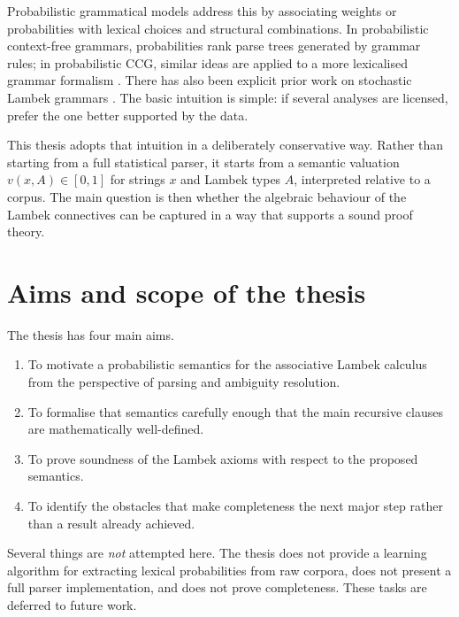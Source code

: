Probabilistic grammatical models address this by associating weights or probabilities with lexical
choices and structural combinations. In probabilistic context-free grammars, probabilities rank
parse trees generated by grammar rules; in probabilistic CCG, similar ideas are applied to a more
lexicalised grammar formalism \citep{ManningSchutze1999,ClarkCurran2007}. There has also been
explicit prior work on stochastic Lambek grammars \citep{BonfanteDeGroote2004}. The basic
intuition is simple: if several analyses are licensed, prefer the one better supported by the data.

This thesis adopts that intuition in a deliberately conservative way. Rather than starting from a
full statistical parser, it starts from a semantic valuation $v(x,A) \in [0,1]$ for strings $x$ and
Lambek types $A$, interpreted relative to a corpus. The main question is then whether the
algebraic behaviour of the Lambek connectives can be captured in a way that supports a
sound proof theory.


\section{Aims and scope of the thesis}
The thesis has four main aims.
\begin{enumerate}[label=(\roman*)]
    \item To motivate a probabilistic semantics for the associative Lambek calculus from the
    perspective of parsing and ambiguity resolution.
    \item To formalise that semantics carefully enough that the main recursive clauses are
    mathematically well-defined.
    \item To prove soundness of the Lambek axioms with respect to the proposed semantics.
    \item To identify the obstacles that make completeness the next major step rather than a result
    already achieved.
\end{enumerate}

Several things are \emph{not} attempted here. The thesis does not provide a learning algorithm for
extracting lexical probabilities from raw corpora, does not present a full parser implementation,
and does not prove completeness. These tasks are deferred to future work.

